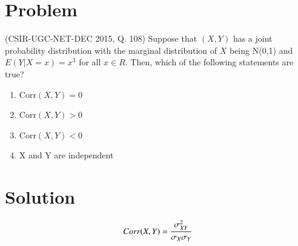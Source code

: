\documentclass[journal,12pt,twocolumn]{IEEEtran}
\begin{document}
\section{Problem}
(CSIR-UGC-NET-DEC 2015, Q. 108) Suppose that $(X,Y)$ has a joint probability distribution with the marginal distribution of $X$ being N(0,1) and $E(Y|X=x)=x^3$ for all $x \in R$. Then, which of the following statements are true?
\begin{enumerate}
    \item Corr$(X,Y) = 0$
    \item Corr$(X,Y) > 0$
    \item Corr$(X,Y) < 0$
    \item X and Y are independent
\end{enumerate}
\section{Solution}
\begin{align}
    Corr(X,Y) = \cfrac{\sigma_{XY}^2}{\sigma_X\sigma_Y}
    \label{correlationofxy}
\end{align}
\end{document}
